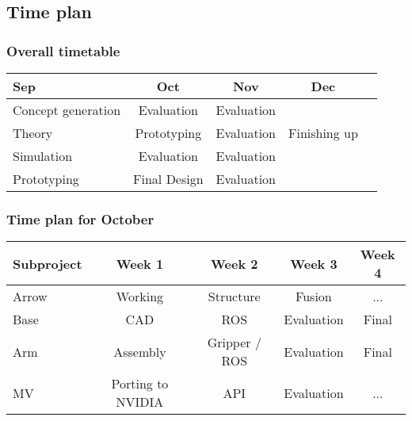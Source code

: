\begin{frame}
    \subsection{Time plan}
    \frametitle{Overall timetable}
    \begin{table}
        \begin{tabular}{| l | c | c | c | c }
            
            Sep & Oct & Nov & Dec \\
            \hline \hline
            Concept generation & Evaluation & Evaluation &  \\ 
            \hline
            Theory & Prototyping & Evaluation & Finishing up \\
            \hline
            Simulation & Evaluation & Evaluation & \\
            \hline
            Prototyping & Final Design & Evaluation &  \\
            \hline
 
        \end{tabular}
    \end{table}    
\end{frame}

\begin{frame}
    
    \frametitle{Time plan for October}
    \begin{table}
        \begin{tabular}{l | c | c | c | c }
        Subproject & Week 1 & Week 2 & Week 3 & Week 4 \\
        \hline \hline
            Arrow & Working & Structure & Fusion & ...\\
            Base & CAD & ROS & Evaluation & Final\\
            Arm  & Assembly & Gripper / ROS & Evaluation & Final\\
            MV & Porting to NVIDIA & API & Evaluation & ...\\
        \end{tabular}
    \end{table}
\end{frame}